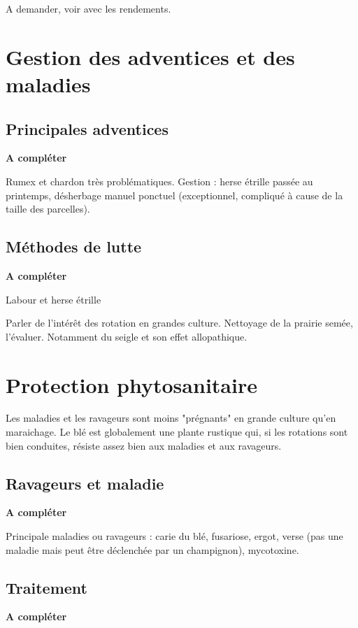 \documentclass{article}
\begin{document}
A demander, voir avec les rendements. 

\section{Gestion des adventices et des maladies}

\subsection{Principales adventices}

\textbf{A compléter}

Rumex et chardon très problématiques. Gestion : herse étrille passée au printemps, désherbage manuel ponctuel (exceptionnel, compliqué à cause de la taille des parcelles).

\subsection{Méthodes de lutte}

\textbf{A compléter}

Labour et herse étrille

Parler de l'intérêt des rotation en grandes culture. Nettoyage de la prairie semée, l'évaluer. Notamment du seigle et son effet allopathique.

\section{Protection phytosanitaire}

Les maladies et les ravageurs sont moins "prégnants" en grande culture qu'en maraichage. Le blé est globalement une plante rustique qui, si les rotations sont bien conduites, résiste assez bien aux maladies et aux ravageurs.

\subsection{Ravageurs et maladie}

\textbf{A compléter}

Principale maladies ou ravageurs : carie du blé, fusariose, ergot, verse (pas une maladie mais peut être déclenchée par un champignon), mycotoxine.

\subsection{Traitement}

\textbf{A compléter}
\end{document}

